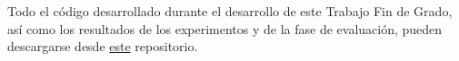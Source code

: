 Todo el código desarrollado durante el desarrollo de este Trabajo Fin de Grado, así como los resultados de los experimentos y de la fase de evaluación, pueden descargarse desde \href{https://github.com/huglope/TFG}{este} repositorio.